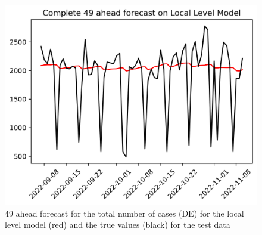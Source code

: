 \begin{figure}
\begin{minipage}{.32\textwidth}
  \label{fig:tot_cases_fc_49_LLM}
\end{minipage}
\begin{minipage}{.32\textwidth}
  \centering
  \includegraphics[width=\linewidth]{pics/49_ah/DE_Complete_49_ahead_Local Level Model.png}
  \caption{49 ahead forecast for the total number of cases (DE) for the local level model (red) and the true values (black) for the test data}
  \label{fig:tot_cases_fc_49_LLM_DE}
\end{minipage}

\end{figure}
